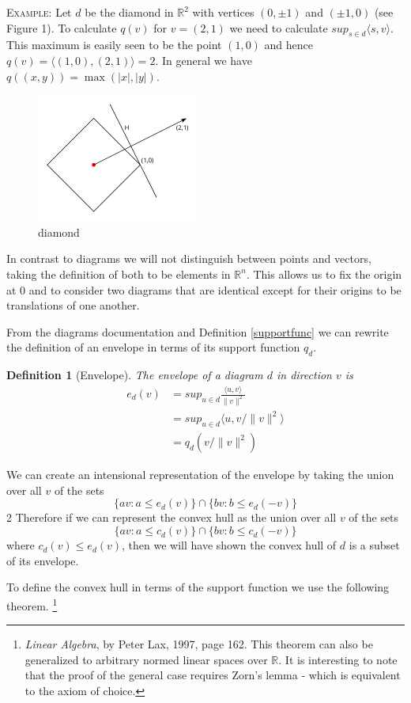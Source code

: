 \documentclass[11pt]{amsart}
\newtheorem{defn}{Definition}
\begin{document}
\textsc{Example}: Let $d$ be the diamond in $\mathbb{R}^2$ with vertices $(0, \pm1)$ and $(\pm 1, 0)$ (see Figure 1). To calculate $q(v)$ for $v = (2,1)$ 
we need to calculate $sup_{s \in d} \langle s, v \rangle$. This maximum is easily seen to be the point $(1,0)$ and hence $q(v) = \langle (1,0),(2,1) \rangle = 2$. In
general we have $q((x,y)) = \max(|x|,|y|)$.

\begin{figure}[h]
\label{diamond}
\centering
\includegraphics[width=150pt]{diamond.png}
\caption{diamond}
\end{figure}

In contrast to diagrams we will not distinguish between points and vectors, taking the definition of both to be elements in $\mathbb{R}^n$.
This allows us to fix the origin at $0$ and to consider two diagrams that are identical except for their origins to be translations of one another.

From the diagrams documentation and Definition \ref{supportfunc} we can rewrite the definition of an envelope 
in terms of its support function $q_d$.
\begin{defn}[Envelope]
The envelope of a diagram $d$ in direction $v$ is
\begin{align}
e_d(v) &= sup_{u \in d} \frac{\langle u, v \rangle}{\|v\|^2}\\
           &=sup_{u \in d} \langle u, v/\|v\|^2 \rangle\\
           &=q_d(v/\|v\|^2)
\end{align}
\end{defn}

We can create an intensional representation of the envelope by taking the union over all $v$ of the sets
$$\{av : a \leq e_d(v)\} \cap \{ bv : b \leq e_d(-v)\}$$2
Therefore if we can represent the convex hull as the union over all $v$ of the sets
$$\{av : a \leq c_d(v)\} \cap \{ bv : b \leq c_d(-v)\}$$
where $c_d(v) \leq e_d(v)$, then we will have shown the convex hull of $d$ is a subset of its envelope.

To define the convex hull in terms of the support function we use the following theorem. 
\footnote{\emph{Linear Algebra}, by Peter Lax, 1997, page 162. This theorem can also be generalized to
arbitrary normed linear spaces over $\mathbb{R}$. It is interesting to note that the proof of the general case requires
Zorn's lemma - which is equivalent to the axiom of choice.}
\end{document}
